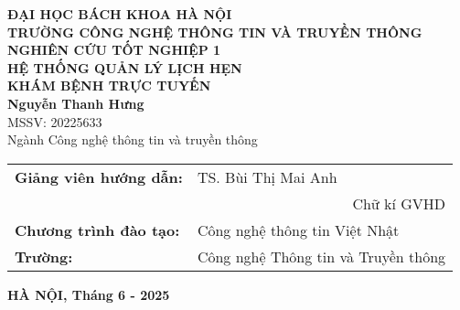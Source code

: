 \documentclass[DoAn.tex]{subfiles}
\begin{document}
\begin{titlepage}
\thispagestyle{empty}
\begin{center}

{\textbf{\large{ĐẠI HỌC BÁCH KHOA HÀ NỘI}}}\\
{\textbf{\large{TRƯỜNG CÔNG NGHỆ THÔNG TIN VÀ TRUYỀN THÔNG}}}\\[3cm]

{\textbf{\huge{NGHIÊN CỨU TỐT NGHIỆP 1}}}\\[1cm]
{\textbf{\Large{HỆ THỐNG QUẢN LÝ LỊCH HẸN}}}\\
{\textbf{\Large{KHÁM BỆNH TRỰC TUYẾN}}}\\[2cm]

{\textbf{\large{Nguyễn Thanh Hưng}}}\\
{\large{MSSV: 20225633}}\\[0.5cm]
{\large{Ngành Công nghệ thông tin và truyền thông}}\\[3cm]

\end{center}

\begin{flushleft}
\begin{tabular}{ll}
\textbf{Giảng viên hướng dẫn:} & TS. Bùi Thị Mai Anh \\[0.5cm]
& \multicolumn{1}{r}{Chữ kí GVHD} \\[1cm]
\textbf{Chương trình đào tạo:} & Công nghệ thông tin Việt Nhật \\[0.5cm]
\textbf{Trường:} & Công nghệ Thông tin và Truyền thông \\
\end{tabular}
\end{flushleft}

\vfill
\begin{center}
{\textbf{HÀ NỘI, Tháng 6 - 2025}}
\end{center}

\end{titlepage}
\end{document}
